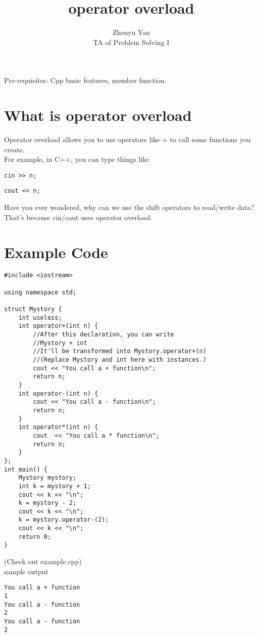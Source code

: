 \documentclass{article}
\title{operator overload}
\author{Zhenyu Yan\\TA of Problem Solving I}
\date{}
\begin{document}
\maketitle
Pre-requisites: Cpp basic features, member function.
\section{What is operator overload}
Operator overload allows you to use operators like + to call some functions you create.\\
For example, in C++, you can type things like
\begin{lstlisting}
cin >> n;
\end{lstlisting}
\begin{lstlisting}
cout << n;
\end{lstlisting}
Have you ever wondered, why can we use the shift operators to read/write data?\\
That's because cin/cout uses operator overload.
\newpage
\section{Example Code}
\begin{lstlisting}
#include <iostream>

using namespace std;

struct Mystory {
    int useless;
    int operator+(int n) {
        //After this declaration, you can write
        //Mystory + int
        //It'll be transformed into Mystory.operator+(n)
        //(Replace Mystory and int here with instances.)
        cout << "You call a + function\n";
        return n;
    }
    int operator-(int n) {
        cout << "You call a - function\n";
        return n;
    }
    int operator*(int n) {
        cout  << "You call a * function\n";
        return n;
    }
};
int main() {
    Mystory mystory;
    int k = mystory + 1;
    cout << k << "\n";
    k = mystory - 2;
    cout << k << "\n";
    k = mystory.operator-(2);
    cout << k << "\n";
    return 0;
}
\end{lstlisting}
(Check out example.cpp)\\
sample output
\begin{lstlisting}
You call a + function
1
You call a - function
2
You call a - function
2
\end{lstlisting}
\newpage
\end{document}
